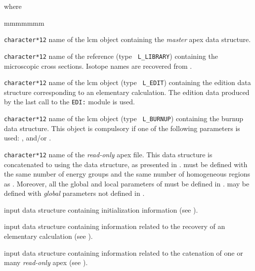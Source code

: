 \noindent where
\begin{ListeDeDescription}{mmmmmmm}

\item[\dusa{APXNAM}] {\tt character*12} name of the {\sc lcm} object containing the
{\sl master} {\sc apex} data structure.

\item[\dusa{HMIC}] {\tt character*12} name of the reference  (type {\tt
L\_LIBRARY}) containing the microscopic cross sections. Isotope names are recovered
from .

\item[\dusa{EDINAM}] {\tt character*12} name of the {\sc lcm} object (type {\tt
L\_EDIT}) containing the {\sc edition} data structure corresponding to an elementary
calculation. The {\sc edition} data produced by the last call to the {\tt EDI:} module
is used.

\item[\dusa{BRNNAM}] {\tt character*12} name of the {\sc lcm} object (type {\tt
L\_BURNUP}) containing the {\sc burnup} data structure. This object is compulsory if one
of the following parameters is used: ,  and/or .

\item[\dusa{APXRHS}] {\tt character*12} name of the {\sl read-only} {\sc apex} file. This
data structure is concatenated to  using the  data structure,
as presented in .  must be defined with the same number of energy
groups and the same number of homogeneous regions as . Moreover, all the
global and local parameters of  must be defined in . 
may be defined with {\sl global} parameters not defined in .

\item[\dusa{apex\_data1}] input data structure containing initialization information (see ).

\item[\dusa{apex\_data2}] input data structure containing information related to the recovery of an
elementary calculation (see ).

\item[\dusa{apex\_data3}] input data structure containing information related to the catenation of one or many
{\sl read-only} {\sc apex} (see ).

\end{ListeDeDescription}

